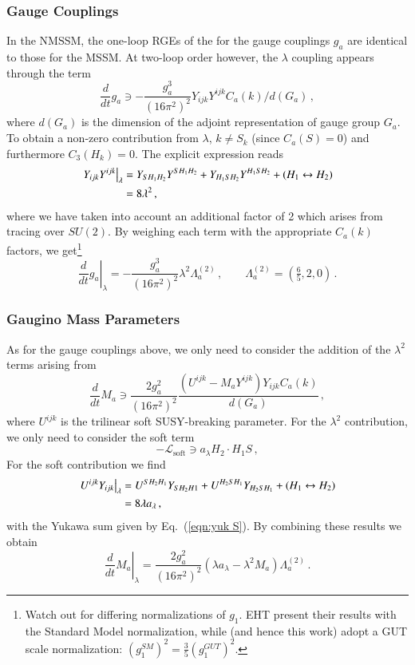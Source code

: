 \documentclass[final,3p,times,pdflatex]{elsarticle}
\newcommand{\lamsq}{\lambda^2}
\newcommand{\dt}{\frac{d}{dt}}
\begin{document}
\subsubsection{Gauge Couplings}
In the NMSSM, the one-loop RGEs of the for the gauge couplings $g_a$ are 
identical to those for the MSSM.  At two-loop order however, the $\lambda$ 
coupling appears through the term
%
\begin{equation}
\dt g_a \ni - \frac{g_a^3}{(16\pi^2)^2} Y_{ijk}Y^{ijk} C_a(k)/d(G_a)\,,  
\end{equation}
%
where $d(G_a)$ is the dimension of the adjoint representation of gauge group 
$G_a$.  To obtain a non-zero contribution from $\lambda$, $k\neq S_k$ (since 
$C_a(S)=0$) and furthermore $C_3(H_k)=0$. The explicit expression reads
%
\begin{align}
\left. Y_{ijk}Y^{ijk}\right|_\lambda &= Y_{SH_1H_2}Y^{SH_1H_2} 
+ Y_{H_1SH_2}Y^{H_1SH_2} + (H_1 \leftrightarrow H_2) \notag \\
%
&= 8\lambda^2\,,
\label{eqn:yuk S}\end{align}
%
where we have taken into account an additional factor of 2 which arises from 
tracing over $SU(2)$.  By weighing each term with the appropriate $C_a(k)$ 
factors, we get\footnote{Watch out for differing normalizations of $g_1$.  
EHT present their results with the Standard Model normalization, while 
\cite{MV94} (and hence this work) adopt a GUT scale normalization: 
$(g_1^{SM})^2 = \tfrac{3}{5}(g_1^{GUT})^2$.}
%
\begin{equation}
\left. \dt g_a\right|_\lambda = -\frac{g_a^3}{(16\pi^2)^2}\lamsq \Lambda_a^{(2)}\,,
\qquad \Lambda_a^{(2)} = (\tfrac{6}{5},2,0)\,.
\end{equation}

\subsubsection{Gaugino Mass Parameters}
As for the gauge couplings above, we only need to consider the addition of the 
$\lambda^2$ terms arising from
%
\begin{equation}
\dt M_a \ni \frac{2g_a^2}{(16\pi^2)^2} 
\frac{(U^{ijk} - M_a Y^{ijk}) Y_{ijk}C_a(k)}{d(G_a)}\,,
\end{equation}
%
where $U^{ijk}$ is the trilinear soft SUSY-breaking parameter.  For the 
$\lambda^2$ contribution, we only need to consider the soft term
%
\begin{equation}
-\mathcal{L}_{\mathrm{soft}} \ni a_\lambda H_2\cdot H_1 S\,,
\end{equation}
%
For the soft contribution we find
%
\begin{align}
\left. U^{ijk}Y_{ijk}\right|_{\lambda} &= U^{SH_2H_1}Y_{SH_2H1} 
+ U^{H_2SH_1}Y_{H_2SH_1} + (H_1 \leftrightarrow H_2) \notag \\
%
&= 8\lambda a_\lambda\,,
\end{align}
%
with the Yukawa sum given by Eq.~(\ref{eqn:yuk S}).  By combining these results 
we obtain
%
\begin{equation}
\left. \dt M_a\right|_{\lambda} = \frac{2g_a^2}{(16\pi^2)^2} 
(\lambda a_\lambda - \lambda^2 M_a)\Lambda^{(2)}_a\,.
\end{equation}
\end{document}

